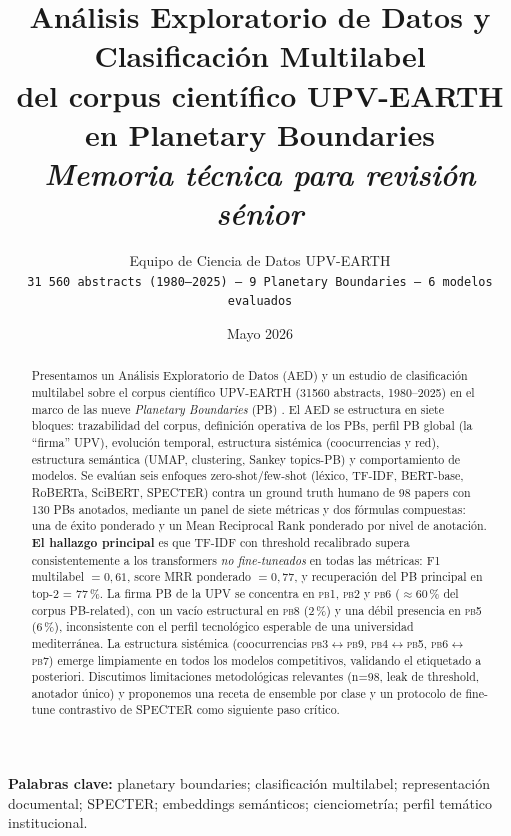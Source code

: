 \documentclass[11pt,a4paper]{article}
\title{\vspace*{-1.2cm}
\Large\bfseries\textcolor{accent}{Análisis Exploratorio de Datos y Clasificación Multilabel\\
del corpus científico UPV-EARTH en Planetary Boundaries}\\[0.4em]
\large\textit{Memoria técnica para revisión sénior}}
\author{\normalsize Equipo de Ciencia de Datos UPV-EARTH \\
\small \texttt{31\,560 abstracts (1980--2025) -- 9 Planetary Boundaries -- 6 modelos evaluados}}
\date{Mayo 2026}
\newcommand{\pb}[1]{\textsc{pb#1}}
\begin{document}
\maketitle
\thispagestyle{empty}
\vspace*{-1em}

\begin{abstract}
\noindent
Presentamos un Análisis Exploratorio de Datos (AED) y un estudio de clasificación multilabel sobre el corpus científico UPV-EARTH (\num{31560} abstracts, 1980--2025) en el marco de las nueve \emph{Planetary Boundaries} (PB) \cite{steffen2015planetary,rockstrom2009safe}. El AED se estructura en siete bloques: trazabilidad del corpus, definición operativa de los PBs, perfil PB global (la ``firma'' UPV), evolución temporal, estructura sistémica (coocurrencias y red), estructura semántica (UMAP, clustering, Sankey topics-PB) y comportamiento de modelos. Se evalúan seis enfoques zero-shot/few-shot (léxico, TF-IDF, BERT-base, RoBERTa, SciBERT, SPECTER) contra un ground truth humano de 98 papers con 130 PBs anotados, mediante un panel de siete métricas y dos fórmulas compuestas: una de éxito ponderado y un Mean Reciprocal Rank ponderado por nivel de anotación. \textbf{El hallazgo principal} es que TF-IDF con threshold recalibrado supera consistentemente a los transformers \emph{no fine-tuneados} en todas las métricas: F1 multilabel $= 0{,}61$, score MRR ponderado $= 0{,}77$, y recuperación del PB principal en top-2 = 77\,\%. La firma PB de la UPV se concentra en \pb1, \pb2 y \pb6 ($\approx 60\,\%$ del corpus PB-related), con un vacío estructural en \pb8 (2\,\%) y una débil presencia en \pb5 (6\,\%), inconsistente con el perfil tecnológico esperable de una universidad mediterránea. La estructura sistémica (coocurrencias \pb3$\leftrightarrow$\pb9, \pb4$\leftrightarrow$\pb5, \pb6$\leftrightarrow$\pb7) emerge limpiamente en todos los modelos competitivos, validando el etiquetado a posteriori. Discutimos limitaciones metodológicas relevantes (n=98, leak de threshold, anotador único) y proponemos una receta de ensemble por clase y un protocolo de fine-tune contrastivo de SPECTER como siguiente paso crítico.
\end{abstract}

\medskip
\noindent\textbf{Palabras clave:} planetary boundaries; clasificación multilabel; representación documental; SPECTER; embeddings semánticos; cienciometría; perfil temático institucional.

\tableofcontents
\clearpage

\end{document}
